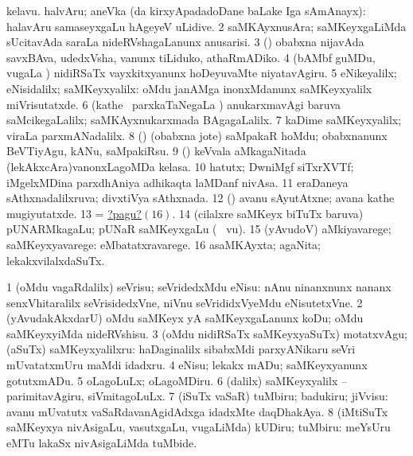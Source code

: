 \noindent
\gl{\pagu}
\bmng
\bnum
{}  
\banum
{} kelavu. 
 halvAru; aneVka (\bava da kirxyApadadoDane baLake Iga sAmAnayx):  halavAru samaseyxgaLu hAgeyeV uLidive. 
\eanum
\numie
\num{2}  saMKAyxnusAra; saMKeyxgaLiMda sUcitavAda saraLa nideRVshagaLanunx anusarisi. 
\num{3} (\ashi) obabxna nijavAda savxBAva, udedxVsha, \mo vanunx tiLiduko, athaRmADiko. 
\num{4} (bAMbf guMDu, \mo vugaLa \vi) nidiRSaTx vayxkitxyanunx hoDeyuvaMte niyatavAgiru. 
\num{5}  eNikeyalilx; eNisidalilx; saMKeyxyalilx:  oMdu janAMga inonxMdanunx saMKeyxyalilx miVrisutatxde. 
\num{6} (kathe \mo\ parxkaTaNegaLa \vi) anukarxmavAgi baruva saMcikegaLalilx; saMKAyxnukarxmada BAgagaLalilx. 
\num{7}  kaDime saMKeyxyalilx; viraLa parxmANadalilx. 
\num{8} (\ashi) (obabxna jote) saMpakaR hoMdu; obabxnanunx BeVTiyAgu, kANu, saMpakiRsu. 
\num{9}  (\hiV) keVvala aMkagaNitada (lekAkxcAra)vanonxLagoMDa kelasa. 
\num{10}  hatutx; DwniMgf siTxrXVTf; iMgelxMDina parxdhAniya adhikaqta laMDanf nivAsa. 
\num{11}  eraDaneya sAthxnadalilxruva; divxtiVya sAthxnada. 
\num{12} (\AmA) avanu sAyutAtxne; avana kathe mugiyutatxde. 
\num{13}  = \hyperlink{numberpagu16}{?pagu?\((16)\)}. 
\num{14}  (cilalxre saMKeyx biTuTx baruva) pUNARMkagaLu; pUNaR saMKeyxgaLu (\udA\  \mo vu). 
\num{15} (yAvudoV) aMkiyavarege; saMKeyxyavarege:  eMbatatxravarege. 
\hypertarget{numberpagu16}{} 
\num{16}  asaMKAyxta; agaNita; lekakxvilalxdaSuTx. 
\enum
\emng
\eentry

\bentry
{}
\gl{\sakirx}
\bmng
\bnum
\num{1} (oMdu vagaRdalilx) seVrisu; seVridedxMdu eNisu:  nAnu ninanxnunx nananx senxVhitaralilx seVrisidedxVne, niVnu seVrididxVyeMdu eNisutetxVne. 
\num{2} (yAvudakAkxdarU) oMdu saMKeyx yA saMKeyxgaLanunx koDu; oMdu saMKeyxyiMda nideRVshisu. 
\num{3} (oMdu nidiRSaTx saMKeyxyaSuTx) motatxvAgu; (aSuTx) saMKeyxyalilxru:  haDaginalilx sibabxMdi parxyANikaru seVri mUvatatxmUru maMdi idadxru. 
\num{4} eNisu; lekakx mADu; saMKeyxyanunx gotutxmADu. 
\num{5} oLagoLuLx; oLagoMDiru. 
\num{6} (\kaparx dalilx) saMKeyxyalilx -- parimitavAgiru, siVmitagoLuLx. 
\num{7} (iSuTx vaSaR) tuMbiru; badukiru; jiVvisu:  avanu mUvatutx vaSaRdavanAgidAdxga idadxMte daqDhakAya. 
\num{8} (iMtiSuTx saMKeyxya nivAsigaLu, vasutxgaLu, \mo vugaLiMda) kUDiru; tuMbiru:  meYsUru eMTu lakaSx nivAsigaLiMda tuMbide. 
\enum
\emng


